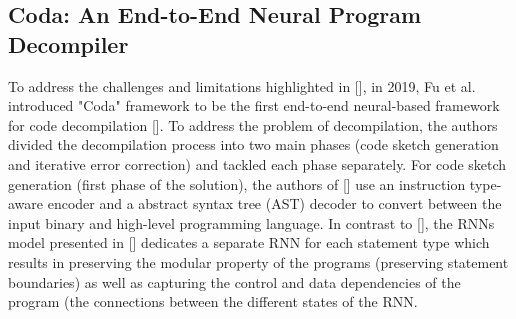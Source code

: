 \documentclass{article}
\begin{document}
\subsection{Coda: An End-to-End Neural Program Decompiler}
\noindent To address the challenges and limitations highlighted in [], in 2019, Fu et al. introduced "Coda" framework to be the first end-to-end neural-based framework for code decompilation [].
To address the problem of decompilation, the authors divided the decompilation process into two main phases (code sketch generation and iterative error correction) and tackled each phase separately.
For code sketch generation (first phase of the solution), the authors of [] use an instruction type-aware encoder and a abstract syntax tree (AST) decoder to convert between the input binary and high-level programming language.
In contrast to [], the RNNs model presented in [] dedicates a separate RNN for each statement type which results in preserving the modular property of the programs (preserving statement boundaries) as well as capturing the control and data dependencies of the program (the connections between the different states of the RNN.  \\\\
\end{document}
